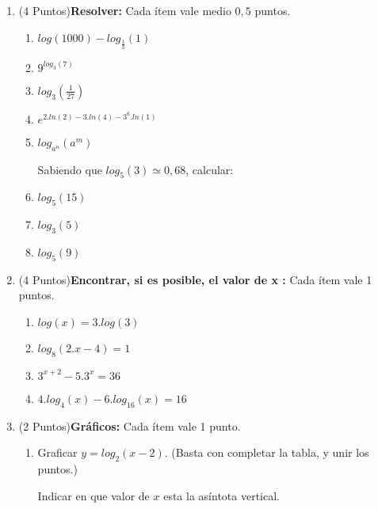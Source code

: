 \documentclass[a4paper,11pt,spanish,sans]{exam}
\begin{document}
\begin{enumerate}
\item (4 Puntos)\textbf{Resolver:} Cada ítem vale medio $0,5$ puntos.
\begin{multicols}{2}
\begin{enumerate}
\item $log(1000)-log_{\frac{1}{3}}(1)$
\item $9^{log_3(7)}$
\item $log_3(\frac{1}{27})$
\item $e^{2.ln(2) - 3.ln(4) - 3^{6}.ln(1)}$

\columnbreak

\item $log_{a^n}(a^m)$

Sabiendo que $log_5(3)\simeq 0,68$, calcular:

\item $log_5(15)$
\item $log_3(5)$
\item $log_5(9)$


\end{enumerate}
\end{multicols}



\item (4 Puntos)\textbf{Encontrar, si es posible, el valor de x :}
Cada ítem vale 1 puntos.
\begin{enumerate}
\item $log(x)=3.log(3)$
\item $log_8(2.x-4)=1$
\item $3^{x+2}-5.3^x=36$
\item $4.log_4(x)-6.log_{16}(x)=16 $
\end{enumerate}

\item (2 Puntos)\textbf{Gráficos:}
Cada ítem vale 1 punto.
\begin{enumerate}

\item  Graficar $y=log_{2}(x-2)$. (Basta con completar la tabla, y unir los puntos.)

Indicar en que  valor de $x$ esta la asíntota vertical. 




\end{enumerate}
\end{enumerate}
\end{document}
